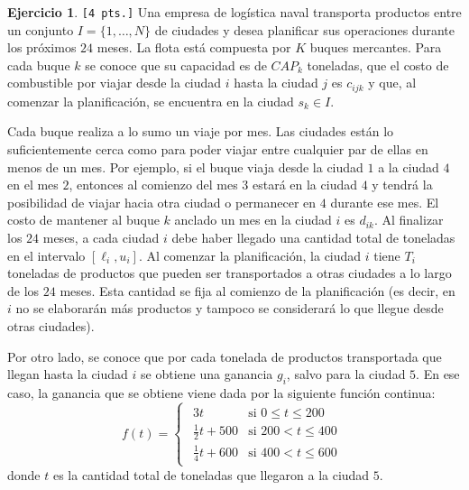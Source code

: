 \documentclass[a4paper,oneside,12pt]{amsart}
\theoremstyle{definition}
\newtheorem{quest}{Ejercicio}
\begin{document}
\begin{quest} 

\verb|[4 pts.]| Una empresa de logística naval transporta productos entre un conjunto $I=\{1,\dots,N\}$ de ciudades y desea planificar sus operaciones durante los próximos $24$ meses. La flota está compuesta por $K$ buques mercantes. Para cada buque $k$ se conoce que su capacidad es de $CAP_k$ toneladas, que el costo de combustible por viajar desde la ciudad $i$ hasta la ciudad $j$ es $c_{ijk}$ y que, al comenzar la planificación, se encuentra en la ciudad $s_{k}\in I$. 

Cada buque realiza a lo sumo un viaje por mes. Las ciudades están lo suficientemente cerca como para poder viajar entre cualquier par de ellas en menos de un mes. Por ejemplo, si el buque viaja desde la ciudad $1$ a la ciudad $4$ en el mes $2$, entonces al comienzo del mes $3$ estará en la ciudad $4$ y tendrá la posibilidad de viajar hacia otra ciudad o permanecer en $4$ durante ese mes. El costo de mantener al buque $k$ anclado un mes en la ciudad $i$ es $d_{ik}$. Al finalizar los $24$ meses, a cada ciudad $i$ debe haber llegado una cantidad total de toneladas en el intervalo $[\ell_{i}, u_{i}]$. Al comenzar la planificación, la ciudad $i$ tiene $T_i$ toneladas de productos que pueden ser transportados a otras ciudades a lo largo de los $24$ meses. Esta cantidad se fija al comienzo de la planificación (es decir, en $i$ no se elaborarán más productos y tampoco se considerará lo que llegue desde otras ciudades). 

Por otro lado, se conoce que por cada tonelada de productos transportada que llegan hasta la ciudad $i$ se obtiene una ganancia $g_{i}$, salvo para la ciudad $5$. En ese caso, la ganancia que se obtiene viene dada por la siguiente función continua:
\[ f(t)=
\begin{cases}
    \begin{array}{lr}
        3t & \text{si } 0\leq t \leq 200 \\
        \frac{1}{2}t + 500 & \text{si } 200 < t \leq 400 \\
        \frac{1}{4}t + 600 & \text{si } 400 < t \leq 600 
    \end{array}
\end{cases}
\]
donde $t$ es la cantidad total de toneladas que llegaron a la ciudad $5$.


\end{quest}
\end{document}

